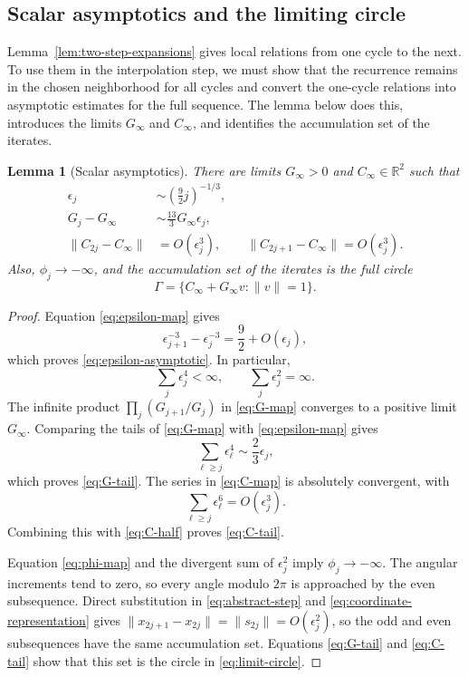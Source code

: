 \documentclass[11pt]{article}
\newtheorem{lemma}[theorem]{Lemma}
\newcommand{\R}{\mathbb R}
\begin{document}
\subsection{Scalar asymptotics and the limiting circle}

Lemma~\ref{lem:two-step-expansions} gives local relations from one cycle to the
next.  To use them in the interpolation step, we must show that the recurrence
remains in the chosen neighborhood for all cycles and convert the one-cycle
relations into asymptotic estimates for the full sequence.  The lemma below
does this, introduces the limits $G_\infty$ and $C_\infty$, and identifies the
accumulation set of the iterates.

\begin{lemma}[Scalar asymptotics]\label{lem:scalar-asymptotics}
There are limits $G_\infty>0$ and $C_\infty\in\R^2$ such that
\begin{align}
\epsilon_j&\sim\left(\frac92j\right)^{-1/3},
\label{eq:epsilon-asymptotic}\\
G_j-G_\infty&\sim\frac{13}{3}G_\infty\epsilon_j,
\label{eq:G-tail}\\
\|C_{2j}-C_\infty\|&=O(\epsilon_j^3),
\qquad
\|C_{2j+1}-C_\infty\|=O(\epsilon_j^3).
\label{eq:C-tail}
\end{align}
Also, $\phi_j\to-\infty$, and the accumulation set of the iterates is
the full circle
\begin{equation}\label{eq:limit-circle}
\Gamma=\{C_\infty+G_\infty v:\|v\|=1\}.
\end{equation}
\end{lemma}

\begin{proof}
Equation \eqref{eq:epsilon-map} gives
\[
\epsilon_{j+1}^{-3}-\epsilon_j^{-3}
=\frac92+O(\epsilon_j),
\]
which proves \eqref{eq:epsilon-asymptotic}.  In particular,
\[
\sum_j\epsilon_j^4<\infty,
\qquad
\sum_j\epsilon_j^2=\infty.
\]
The infinite product $\prod_j(G_{j+1}/G_j)$ in \eqref{eq:G-map}
converges to a positive limit $G_\infty$.  Comparing the tails of
\eqref{eq:G-map} with
\eqref{eq:epsilon-map} gives
\[
\sum_{\ell\ge j}\epsilon_\ell^4\sim\frac23\epsilon_j,
\]
which proves \eqref{eq:G-tail}.  The series in \eqref{eq:C-map} is absolutely
convergent, with
\[
\sum_{\ell\ge j}\epsilon_\ell^6=O(\epsilon_j^3).
\]
Combining this with \eqref{eq:C-half} proves \eqref{eq:C-tail}.

Equation \eqref{eq:phi-map} and the divergent sum of $\epsilon_j^2$ imply
$\phi_j\to-\infty$.  The angular increments tend to zero, so every angle
modulo $2\pi$ is approached by the even subsequence.  Direct substitution in
\eqref{eq:abstract-step} and \eqref{eq:coordinate-representation} gives
$\|x_{2j+1}-x_{2j}\|=\|s_{2j}\|=O(\epsilon_j^2)$, so the odd and even
subsequences have the same accumulation set.  Equations \eqref{eq:G-tail} and
\eqref{eq:C-tail} show that this set is the circle in
\eqref{eq:limit-circle}.
\end{proof}
\end{document}
